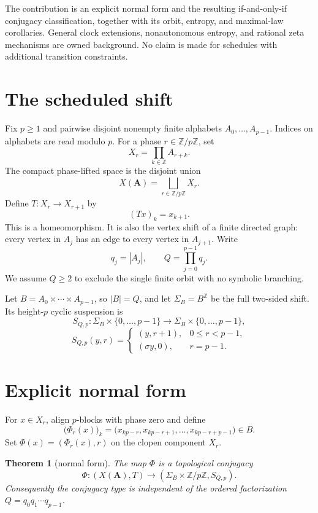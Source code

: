 \documentclass[11pt,a4paper]{amsart}
\newtheorem{theorem}{Theorem}[section]
\theoremstyle{definition}
\theoremstyle{remark}
\newcommand{\Z}{\mathbb Z}
\begin{document}
The contribution is an explicit normal form and the resulting if-and-only-if
conjugacy classification, together with its orbit, entropy, and maximal-law
corollaries.  General clock extensions, nonautonomous entropy, and rational
zeta mechanisms are owned background.  No claim is made for schedules with
additional transition constraints.

\section{The scheduled shift}

Fix $p\geq1$ and pairwise disjoint nonempty finite alphabets
$A_0,\ldots,A_{p-1}$.  Indices on alphabets are read modulo $p$.  For a phase
$r\in\Z/p\Z$, set
\[
 X_r=\prod_{k\in\Z}A_{r+k}.
\]
The compact phase-lifted space is the disjoint union
\[
 X(\mathbf A)=\bigsqcup_{r\in\Z/p\Z}X_r.
\]
Define $T:X_r\to X_{r+1}$ by
\[
 (Tx)_k=x_{k+1}.
\]
This is a homeomorphism.  It is also the vertex shift of a finite directed
graph: every vertex in $A_j$ has an edge to every vertex in $A_{j+1}$.
Write
\[
 q_j=|A_j|,\qquad Q=\prod_{j=0}^{p-1}q_j.
\]
We assume $Q\geq2$ to exclude the single finite orbit with no symbolic
branching.

Let $B=A_0\times\cdots\times A_{p-1}$, so $|B|=Q$, and let
$\Sigma_B=B^\Z$ be the full two-sided shift.  Its height-$p$ cyclic
suspension is
\[
 S_{Q,p}:\Sigma_B\times\{0,\ldots,p-1\}\longrightarrow
 \Sigma_B\times\{0,\ldots,p-1\},
\]
\begin{equation}\label{eq:suspension}
 S_{Q,p}(y,r)=
 \begin{cases}
 (y,r+1),&0\leq r<p-1,\\
 (\sigma y,0),&r=p-1.
 \end{cases}
\end{equation}

\section{Explicit normal form}

For $x\in X_r$, align $p$-blocks with phase zero and define
\begin{equation}\label{eq:block-code}
 \bigl(\Phi_r(x)\bigr)_k
 =\bigl(x_{kp-r},x_{kp-r+1},\ldots,x_{kp-r+p-1}\bigr)\in B.
\end{equation}
Set $\Phi(x)=(\Phi_r(x),r)$ on the clopen component $X_r$.

\begin{theorem}[normal form]\label{thm:normal}
The map $\Phi$ is a topological conjugacy
\[
 \Phi:(X(\mathbf A),T)\longrightarrow
 (\Sigma_B\times\Z/p\Z,S_{Q,p}).
\]
Consequently the conjugacy type is independent of the ordered factorization
$Q=q_0q_1\cdots q_{p-1}$.
\end{theorem}
\end{document}
